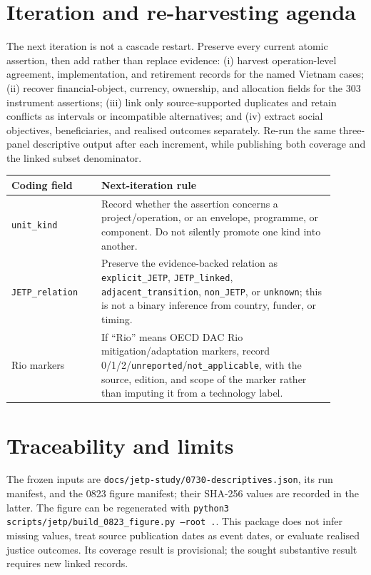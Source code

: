 \documentclass[11pt]{article}
\begin{document}
\section*{Iteration and re-harvesting agenda}
The next iteration is not a cascade restart. Preserve every current atomic
assertion, then add rather than replace evidence: (i) harvest operation-level
agreement, implementation, and retirement records for the named Vietnam cases;
(ii) recover financial-object, currency, ownership, and allocation fields for
the 303 instrument assertions; (iii) link only source-supported duplicates and
retain conflicts as intervals or incompatible alternatives; and (iv) extract
social objectives, beneficiaries, and realised outcomes separately. Re-run the
same three-panel descriptive output after each increment, while publishing both
coverage and the linked subset denominator.

\begin{center}\small
\begin{tabular}{@{}p{0.25\linewidth}p{0.65\linewidth}@{}}
\toprule
Coding field & Next-iteration rule \\
\midrule
\texttt{unit\_kind} & Record whether the assertion concerns a project/operation,
or an envelope, programme, or component. Do not silently promote one kind into
another. \\
\texttt{JETP\_relation} & Preserve the evidence-backed relation as
\texttt{explicit\_JETP}, \texttt{JETP\_linked},
\texttt{adjacent\_transition}, \texttt{non\_JETP}, or \texttt{unknown}; this
is not a binary inference from country, funder, or timing. \\
Rio markers & If ``Rio'' means OECD DAC Rio mitigation/adaptation markers,
record 0/1/2/\texttt{unreported}/\texttt{not\_applicable}, with the source,
edition, and scope of the marker rather than imputing it from a technology label. \\
\bottomrule
\end{tabular}
\end{center}

\section*{Traceability and limits}
The frozen inputs are \texttt{docs/jetp-study/0730-descriptives.json}, its run
manifest, and the 0823 figure manifest; their SHA-256 values are recorded in
the latter. The figure can be regenerated with
\texttt{python3 scripts/jetp/build\_0823\_figure.py --root .}. This package
does not infer missing values, treat source publication dates as event dates,
or evaluate realised justice outcomes. Its coverage result is provisional; the
sought substantive result requires new linked records.



\end{document}
